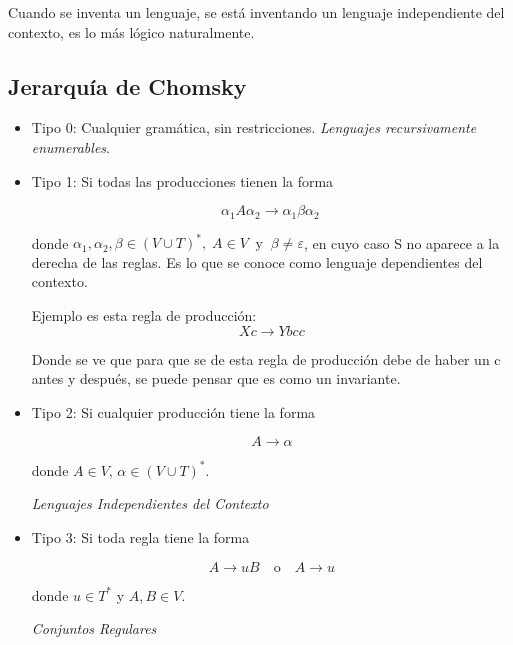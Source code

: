 \documentclass[12pt]{book} %
\begin{document}
Cuando se inventa un lenguaje, se está inventando un lenguaje
independiente del contexto, es lo más lógico naturalmente.

\hypertarget{jerarquuxeda-de-chomsky}{%
\subsection{Jerarquía de Chomsky}\label{jerarquuxeda-de-chomsky}}

\begin{itemize}
\item
  Tipo 0: Cualquier gramática, sin restricciones. \emph{Lenguajes
  recursivamente enumerables}.
\item
  Tipo 1: Si todas las producciones tienen la forma

  \[
    \alpha_1A\alpha_2 \rightarrow \alpha_1\beta\alpha_2\
    \]

  donde
  \(\alpha_1, \alpha_2, \beta \in (V \cup T)^*,\; A \in V \;\; \text{y} \;\; \beta \neq \varepsilon\),
  en cuyo caso S no aparece a la derecha de las reglas. Es lo que se
  conoce como lenguaje dependientes del contexto.

  Ejemplo es esta regla de producción: \[
    Xc \rightarrow Ybcc 
    \]

  Donde se ve que para que se de esta regla de producción debe de haber
  un c antes y después, se puede pensar que es como un invariante.
\item
  Tipo 2: Si cualquier producción tiene la forma

  \[
    A \to \alpha
    \]

  donde \(A \in V\), \(\alpha \in (V \cup T)^*\).

  \emph{Lenguajes Independientes del Contexto}
\item
  Tipo 3: Si toda regla tiene la forma

  \[
    A \to uB \quad \text{o} \quad A \to u
    \]

  donde \(u \in T^*\) y \(A, B \in V\).

  \emph{Conjuntos Regulares}
\end{itemize}

\begin{center}
\end{center}
\end{document}
